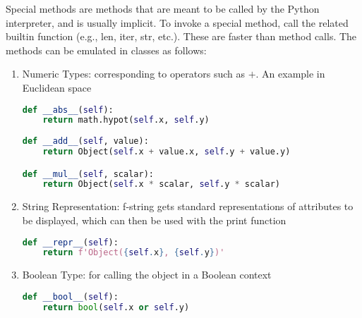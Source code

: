 Special methods are methods that are meant to be called by the Python interpreter, and is usually implicit. To invoke a special method, call the related builtin function (e.g., len, iter, str, etc.). These are faster than method calls. The methods can be emulated in classes as follows:
\begin{enumerate}[label=\roman*.]
\setlength{\itemsep}{0pt}
\item Numeric Types: corresponding to operators such as $+$. An example in Euclidean space
\begin{lstlisting}[language=Python]
def __abs__(self):
	return math.hypot(self.x, self.y)
	
def __add__(self, value):
	return Object(self.x + value.x, self.y + value.y)

def __mul__(self, scalar):
	return Object(self.x * scalar, self.y * scalar)
\end{lstlisting}
\item String Representation: f-string gets standard representations of attributes to be displayed, which can then be used with the print function
\begin{lstlisting}[language=Python]
def __repr__(self):
	return f'Object({self.x}, {self.y})'
\end{lstlisting}
\item Boolean Type: for calling the object in a Boolean context
\begin{lstlisting}[language=Python]
def __bool__(self):
	return bool(self.x or self.y)
\end{lstlisting}
\end{enumerate}
